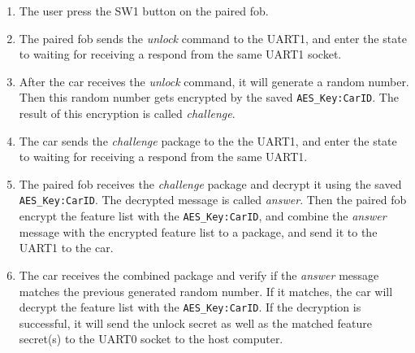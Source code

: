 \documentclass[11pt,oneside,onecolumn,letterpaper]{article}
\begin{document}
\begin{enumerate}
	\item The user press the SW1 button on the paired fob.
	\item The paired fob sends the \textit{unlock} command to the UART1, and enter the state to waiting for receiving a respond from the same UART1 socket.
	\item After the car receives the \textit{unlock} command, it will generate a random number. Then this random number gets encrypted by the saved \verb|AES_Key:CarID|. The result of this encryption is called \textit{challenge}.
	\item The car sends the \textit{challenge} package to the the UART1, and enter the state to waiting for receiving a respond from the same UART1.
	\item The paired fob receives the \textit{challenge} package and decrypt it using the saved \verb|AES_Key:CarID|. The decrypted message is called \textit{answer}. Then the paired fob encrypt the feature list with the \verb|AES_Key:CarID|, and combine the \textit{answer} message with the encrypted feature list to a package, and send it to the UART1 to the car.
	\item The car receives the combined package and verify if the \textit{answer} message matches the previous generated random number. If it matches, the car will decrypt the feature list with the \verb|AES_Key:CarID|. If the decryption is successful, it will send the unlock secret as well as the matched feature secret(s) to the UART0 socket to the host computer.
\end{enumerate}
\end{document}
